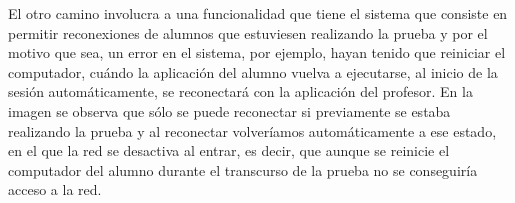 El otro camino involucra a una funcionalidad que tiene el sistema que consiste en permitir reconexiones de alumnos que estuviesen realizando la prueba y por el motivo que sea, un error en el sistema, por ejemplo, hayan tenido que reiniciar el computador, cuándo la aplicación del alumno vuelva a ejecutarse, al inicio de la sesión automáticamente, se reconectará con la aplicación del profesor. En la imagen se observa que sólo se puede reconectar si previamente se estaba realizando la prueba y al reconectar volveríamos automáticamente a ese estado, en el que la red se desactiva al entrar, es decir, que aunque se reinicie el computador del alumno durante el transcurso de la prueba no se conseguiría acceso a la red.
\newline






